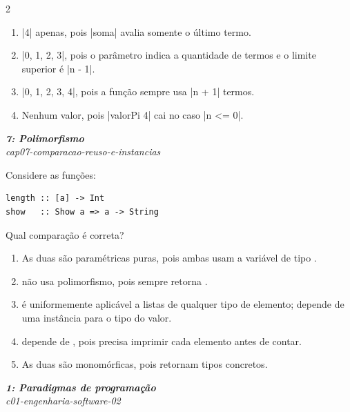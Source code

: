 \documentclass[a4paper,10pt,brazil]{article}
\begin{document}
\begin{multicols}{2}
\begin{enumerate}
  \item \haskellinline|4| apenas, pois \haskellinline|soma| avalia somente o último termo.

  \item \haskellinline|0, 1, 2, 3|, pois o parâmetro indica a quantidade de termos e o limite superior é \haskellinline|n - 1|.

  \item \haskellinline|0, 1, 2, 3, 4|, pois a função sempre usa \haskellinline|n + 1| termos.

  \item Nenhum valor, pois \haskellinline|valorPi 4| cai no caso \haskellinline|n <= 0|.


\end{enumerate}

\begin{flushright}
  \footnotesize
  \textit{\textbf{7: Polimorfismo}}\\
  \textit{cap07-comparacao-reuso-e-instancias}\\

\end{flushright}
Considere as funções:

\begin{verbatim}
length :: [a] -> Int
show   :: Show a => a -> String
\end{verbatim}

Qual comparação é correta?

\begin{enumerate}
  \item As duas são paramétricas puras, pois ambas usam a variável de tipo .
  \item {} não usa polimorfismo, pois sempre retorna .
  \item {} é uniformemente aplicável a listas de qualquer tipo de elemento;  depende de uma instância  para o tipo do valor.
  \item {} depende de , pois precisa imprimir cada elemento antes de contar.
  \item As duas são monomórficas, pois retornam tipos concretos.

\end{enumerate}

\begin{flushright}
  \footnotesize
  \textit{\textbf{1: Paradigmas de programação}}\\
  \textit{c01-engenharia-software-02}\\


\end{flushright}
\end{multicols}
\end{document}
